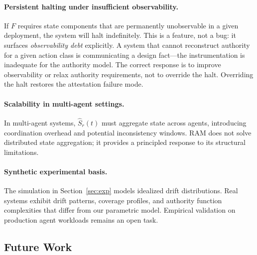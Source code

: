 \documentclass[11pt]{article}
\begin{document}
\paragraph{Persistent halting under insufficient observability.}
If $F$ requires state components that are permanently unobservable in a given
deployment, the system will halt indefinitely.
This is a feature, not a bug: it surfaces \emph{observability debt} explicitly.
A system that cannot reconstruct authority for a given action class is
communicating a design fact---the instrumentation is inadequate for the
authority model.
The correct response is to improve observability or relax authority requirements,
not to override the halt.
Overriding the halt restores the attestation failure mode.

\paragraph{Scalability in multi-agent settings.}
In multi-agent systems, $\hat{S}_r(t)$ must aggregate state across agents,
introducing coordination overhead and potential inconsistency windows.
RAM does not solve distributed state aggregation; it provides a principled
response to its structural limitations.

\paragraph{Synthetic experimental basis.}
The simulation in Section~\ref{sec:exp} models idealized drift distributions.
Real systems exhibit drift patterns, coverage profiles, and authority function
complexities that differ from our parametric model.
Empirical validation on production agent workloads remains an open task.

\subsection{Future Work}
\end{document}
